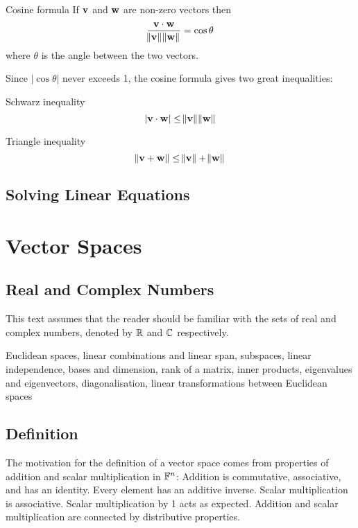 Cosine formula
If $\vb{v}$ and $\vb{w}$ are non-zero vectors then
\begin{equation}
\frac{\vb{v}\cdot\vb{w}}{\norm{\vb{v}}\norm{\vb{w}}} = \cos\theta
\end{equation}
where $\theta$ is the angle between the two vectors.

Since $|\cos\theta|$ never exceeds 1, the cosine formula gives two great inequalities:
\begin{thrm}{Schwarz inequality}{}
\begin{equation}
|\vb{v}\cdot\vb{w}| \le \norm{\vb{v}}\norm{\vb{w}}
\end{equation}
\end{thrm}
\begin{thrm}{Triangle inequality}{}
\begin{equation}
\norm{\vb{v}+\vb{w}} \le \norm{\vb{v}} + \norm{\vb{w}}
\end{equation}
\end{thrm}


\section{Solving Linear Equations}


\chapter{Vector Spaces}
\section{Real and Complex Numbers}
This text assumes that the reader should be familiar with the sets of real and complex numbers, denoted by $\mathbb R$ and $\mathbb C$ respectively.



Euclidean spaces, linear combinations and linear span, subspaces, linear independence, bases and dimension, rank of a matrix, inner products, eigenvalues and eigenvectors, diagonalisation, linear transformations between Euclidean spaces

\section{Definition}
The motivation for the definition of a vector space comes from properties of addition and scalar multiplication in $\mathbb F^n$: Addition is commutative, associative, and has an identity. Every element has an additive inverse. Scalar multiplication is associative. Scalar multiplication by 1 acts as expected. Addition and scalar multiplication are connected by distributive properties. 

